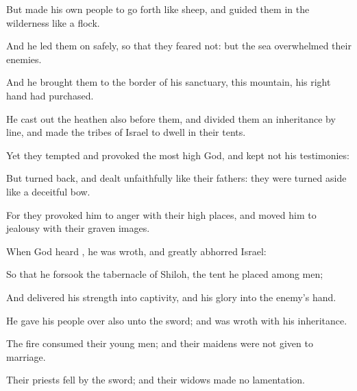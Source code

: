 {\par }{\Q {}But made his own
people to go
forth like
sheep, and
guided them in the
wilderness like a
flock.


\par }{\Q {}And he
led them on
safely, so that they
feared not: but the
sea
overwhelmed their
enemies.


\par }{\Q {}And he
brought them to the
border of his
sanctuary,
{} this
mountain,
{} his right
hand had
purchased.


\par }{\Q {}He cast
out the
heathen also
before them, and
divided them an
inheritance by
line, and made the
tribes of
Israel to
dwell in their
tents.


\par }{\Q {}Yet they
tempted and
provoked the most
high
God, and
kept not his
testimonies:


\par }{\Q {}But turned
back, and dealt
unfaithfully like their
fathers: they were turned
aside like a
deceitful
bow.


\par }{\Q {}For they provoked him to
anger with their high
places, and moved him to
jealousy with their graven
images.


\par }{\Q {}When
God
heard
{}, he was
wroth, and
greatly
abhorred
Israel:


\par }{\Q {}So that he
forsook the
tabernacle of
Shiloh, the
tent
{} he
placed among
men;


\par }{\Q {}And
delivered his
strength into
captivity, and his
glory into the
enemy’s
hand.


\par }{\Q {}He
gave his
people
over also unto the
sword; and was
wroth with his
inheritance.


\par }{\Q {}The
fire
consumed their young
men; and their
maidens were not given to
marriage.


\par }{\Q {}Their
priests
fell by the
sword; and their
widows made no
lamentation.


}
